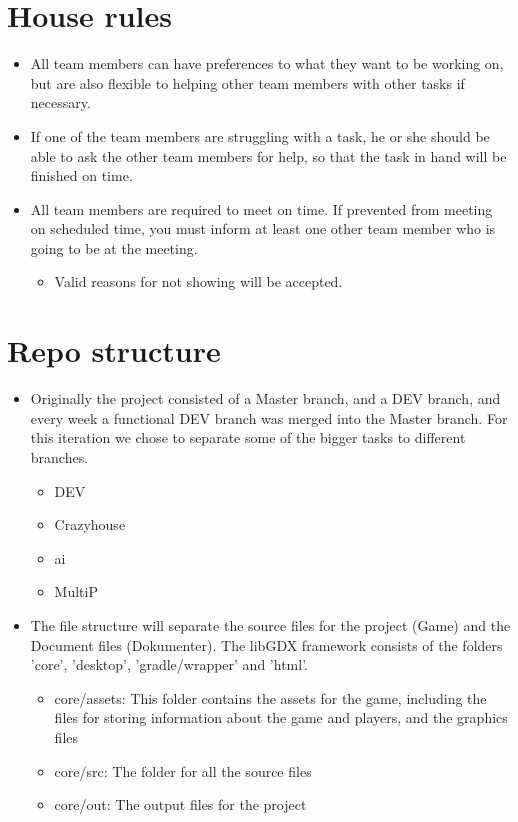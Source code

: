 \documentclass{article}
\begin{document}
\newpage
\section*{House rules}
\begin{itemize}
\item All team members can have preferences to what they want to be working on, but are also flexible to helping other team members with other tasks if necessary.
\item If one of the team members are struggling with a task, he or she should be able to ask the other team members for help, so that the task in hand will be finished on time.
\item All team members are required to meet on time. If prevented from meeting on scheduled time, you must inform at least one other team member who is going to be at the meeting.
	\begin{itemize}
	\item Valid reasons for not showing will be accepted.
	\end{itemize}
\end{itemize}
\section*{Repo structure}
\begin{itemize}
\item Originally the project consisted of a Master branch, and a DEV branch, and every week a functional DEV branch was merged into the Master branch. For this iteration we chose to separate some of the bigger tasks to different branches.
\begin{itemize}
        \item DEV
        \item Crazyhouse
        \item ai 
        \item MultiP
        \end{itemize}
\item The file structure will separate the source files for the project (Game) and the Document files (Dokumenter). The libGDX framework consists of the folders 'core', 'desktop', 'gradle/wrapper' and 'html'.
    \begin{itemize}
        \item core/assets: This folder contains the assets for the game, including the files for storing information about the game and players, and the graphics files
        \item core/src: The folder for all the source files
        \item core/out: The output files for the project
        \end{itemize}
\end{itemize}
\end{document}
